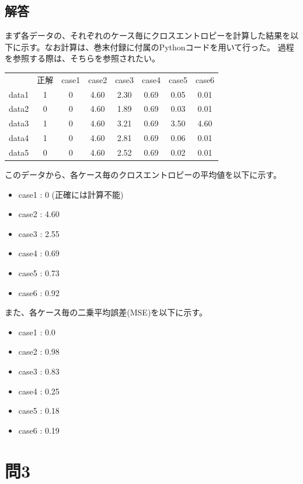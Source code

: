 \documentclass{article}[jsarticle]
\begin{document}
\subsection{解答}
まず各データの、それぞれのケース毎にクロスエントロピーを計算した結果を以下に示す。なお計算は、巻末付録に付属のPythonコードを用いて行った。
過程を参照する際は、そちらを参照されたい。
\begin{table}[H]
    \begin{tabular}{lc|c|c|c|c|c|c}
          & 正解 & case1 & case2 & case3 & case4 & case5 & case6 \\
    data1 & 1  & 0     & 4.60  & 2.30  & 0.69  & 0.05  & 0.01  \\
    data2 & 0  & 0     & 4.60  & 1.89  & 0.69  & 0.03  & 0.01  \\
    data3 & 1  & 0     & 4.60  & 3.21  & 0.69  & 3.50  & 4.60  \\
    data4 & 1  & 0     & 4.60  & 2.81  & 0.69  & 0.06  & 0.01  \\
    data5 & 0  & 0     & 4.60  & 2.52  & 0.69  & 0.02  & 0.01 
    \end{tabular}
    \end{table}
このデータから、各ケース毎のクロスエントロピーの平均値を以下に示す。
\begin{itemize}
    \item case1 : 0 (正確には計算不能)
    \item case2 : 4.60
    \item case3 : 2.55
    \item case4 : 0.69
    \item case5 : 0.73
    \item case6 : 0.92
\end{itemize}
また、各ケース毎の二乗平均誤差(MSE)を以下に示す。
\begin{itemize}
    \item case1 : 0.0
    \item case2 : 0.98
    \item case3 : 0.83
    \item case4 : 0.25
    \item case5 : 0.18
    \item case6 : 0.19
\end{itemize}


\section{問3}
\end{document}
